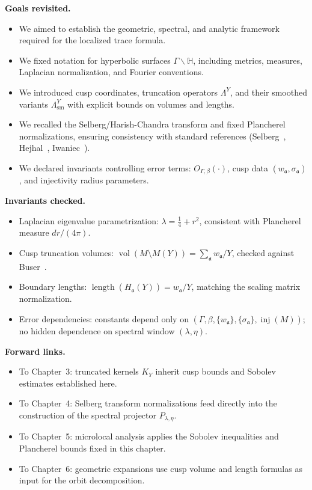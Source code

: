 \medskip
\noindent\textbf{Goals revisited.}
\begin{itemize}
  \item We aimed to establish the geometric, spectral, and analytic framework required for the localized trace formula.
  \item We fixed notation for hyperbolic surfaces $\Gamma \backslash \mathbb{H}$, including metrics, measures, Laplacian normalization, and Fourier conventions.
  \item We introduced cusp coordinates, truncation operators $\Lambda^Y$, and their smoothed variants $\Lambda^Y_{\mathrm{sm}}$ with explicit bounds on volumes and lengths.
  \item We recalled the Selberg/Harish-Chandra transform and fixed Plancherel normalizations, ensuring consistency with standard references (Selberg~\cite{Selberg1956}, Hejhal~\cite{Hejhal1983}, Iwaniec~\cite{Iwaniec2002}).
  \item We declared invariants controlling error terms: $O_{\Gamma,\beta}(\cdot)$, cusp data $(w_\mathfrak{a}, \sigma_\mathfrak{a})$, and injectivity radius parameters.
\end{itemize}

\medskip
\noindent\textbf{Invariants checked.}
\begin{itemize}
  \item Laplacian eigenvalue parametrization: $\lambda = \tfrac14 + r^2$, consistent with Plancherel measure $dr/(4\pi)$.
  \item Cusp truncation volumes: $\operatorname{vol}(M \setminus M(Y)) = \sum_\mathfrak{a} w_\mathfrak{a}/Y$, checked against Buser~\cite{Buser1992}.
  \item Boundary lengths: $\operatorname{length}(H_\mathfrak{a}(Y)) = w_\mathfrak{a}/Y$, matching the scaling matrix normalization.
  \item Error dependencies: constants depend only on $(\Gamma, \beta, \{w_\mathfrak{a}\}, \{\sigma_\mathfrak{a}\}, \operatorname{inj}(M))$; no hidden dependence on spectral window $(\lambda,\eta)$.
\end{itemize}

\medskip
\noindent\textbf{Forward links.}
\begin{itemize}
  \item To Chapter~3: truncated kernels $K_Y$ inherit cusp bounds and Sobolev estimates established here.
  \item To Chapter~4: Selberg transform normalizations feed directly into the construction of the spectral projector $P_{\lambda,\eta}$.
  \item To Chapter~5: microlocal analysis applies the Sobolev inequalities and Plancherel bounds fixed in this chapter.
  \item To Chapter~6: geometric expansions use cusp volume and length formulas as input for the orbit decomposition.
\end{itemize}

